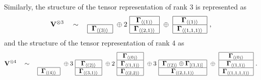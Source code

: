 \documentclass[12pt,reqno]{amsart}
\numberwithin{equation}{section}
\theoremstyle{plain}
\theoremstyle{definition}
\def\o{\otimes}
\def\spV_#1{\boldsymbol\Gamma_{\<#1\>}}
\def\soV_#1{\boldsymbol\Gamma_{[#1]}}
\def\VV{\mathbf V}
\def\<{\langle}
\def\>{\rangle}
\begin{document}
\bigskip

\noindent Similarly, the structure of the tensor representation of rank 3 is
represented as
\begin{equation*}
    \VV^{\o3} \quad\sim\quad
    \begin{tabular}{|c|}
        \multicolumn{1}{c}{ }\\
        \hline
        $\spV_{(3)}$\\
        \hline
    \end{tabular}
    \ \oplus 2 \
    \begin{tabular}{|c|}
        \hline
        $\spV_{(1)}$\\
        \hline
        $\spV_{(2,1)}$\\
        \hline
    \end{tabular}
    \ \oplus \
    \begin{tabular}{|c|}
        \hline
        $\spV_{(1)}$\\
        \hline
        $\spV_{(1,1,1)}$\\
        \hline
    \end{tabular}\ ,
\end{equation*}
and the structure of the tensor representation of rank 4 as
\begin{equation*}
    \VV^{\o4} \quad\sim\quad
        \begin{tabular}{|c|}
        \multicolumn{1}{c}{ }\\
        \multicolumn{1}{c}{ }\\
        \hline
        $\spV_{(4)}$\\
        \hline
    \end{tabular}
    \ \oplus 3 \
    \begin{tabular}{|c|}
        \multicolumn{1}{c}{ }\\
        \hline
        $\spV_{(2)}$\\
        \hline
        $\spV_{(3,1)}$\\
        \hline
    \end{tabular}
    \ \oplus 2 \
    \begin{tabular}{|c|}
        \hline
        $\spV_{(0)}$\\
        \hline
        $\spV_{(1,1)}$\\
        \hline
        $\spV_{(2,2)}$\\
        \hline
    \end{tabular}
    \ \oplus 3 \
    \begin{tabular}{|c|}
        \multicolumn{1}{c}{ }\\
        \hline
        $\spV_{(2)} \oplus \soV_{(1,1)}$\\
        \hline
        $\spV_{(2,1,1)}$\\
        \hline
    \end{tabular}
    \ \oplus \
    \begin{tabular}{|c|}
        \hline
        $\spV_{(0)}$\\
        \hline
        $\spV_{(1,1)}$\\
        \hline
        $\spV_{(1,1,1,1)}$\\
        \hline
    \end{tabular}\ .
\end{equation*}
\end{document}
